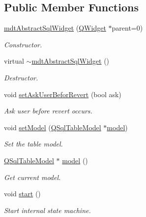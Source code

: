 \subsection*{Public Member Functions}
\begin{DoxyCompactItemize}
\item 
\hyperlink{classmdt_abstract_sql_widget_a74ef509a9487c3985fce7a4cbadbe1b3}{mdt\-Abstract\-Sql\-Widget} (\hyperlink{class_q_widget}{Q\-Widget} $\ast$parent=0)
\begin{DoxyCompactList}\small\item\em Constructor. \end{DoxyCompactList}\item 
virtual \hyperlink{classmdt_abstract_sql_widget_a46dabe9e76aaea93ff20b28863e6c0ff}{$\sim$mdt\-Abstract\-Sql\-Widget} ()
\begin{DoxyCompactList}\small\item\em Destructor. \end{DoxyCompactList}\item 
void \hyperlink{classmdt_abstract_sql_widget_a55faa70683f8374b0ecb703c89b75267}{set\-Ask\-User\-Befor\-Revert} (bool ask)
\begin{DoxyCompactList}\small\item\em Ask user before revert occurs. \end{DoxyCompactList}\item 
void \hyperlink{classmdt_abstract_sql_widget_a8971862741e1ef79c79e11b37e955476}{set\-Model} (\hyperlink{class_q_sql_table_model}{Q\-Sql\-Table\-Model} $\ast$\hyperlink{classmdt_abstract_sql_widget_a298d40a6540aeabbb7644e3c4fd9f3ea}{model})
\begin{DoxyCompactList}\small\item\em Set the table model. \end{DoxyCompactList}\item 
\hyperlink{class_q_sql_table_model}{Q\-Sql\-Table\-Model} $\ast$ \hyperlink{classmdt_abstract_sql_widget_a298d40a6540aeabbb7644e3c4fd9f3ea}{model} ()
\begin{DoxyCompactList}\small\item\em Get current model. \end{DoxyCompactList}\item 
void \hyperlink{classmdt_abstract_sql_widget_a9d901846513af3b93748c9a37e90aae1}{start} ()
\begin{DoxyCompactList}\small\item\em Start internal state machine. \end{DoxyCompactList}\item 

\end{DoxyCompactItemize}
